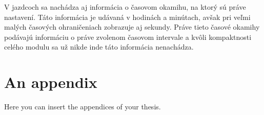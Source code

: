 \documentclass[
  digital, %
  twoside, %
  notable,   %
  nolof,   %
  nolot,   %
]{fithesis3}
\begin{document}
V jazdcoch sa nachádza aj informácia o časovom okamihu, na ktorý sú práve nastavení. Táto informácia je udávaná v hodinách a minútach, avšak pri veľmi malých časových ohraničeniach zobrazuje aj sekundy. Práve tieto časové okamihy podávajú informáciu o práve zvolenom časovom intervale a kvôli kompaktnosti celého modulu sa už nikde inde táto informácia nenachádza.



\printbibliography[heading=bibintoc] %

  \makeatletter\thesis@blocks@clear\makeatother
  \printindex

\appendix %
\chapter{An appendix}
Here you can insert the appendices of your thesis.
\end{document}
